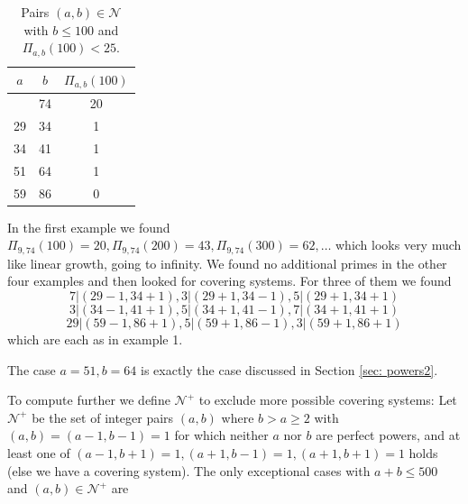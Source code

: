 \documentclass[12pt, a4paper,  reqno, english]{amsart}%
\numberwithin{equation}{section}
\theoremstyle{definition}
\renewcommand{\leq}{\leqslant}
\renewcommand{\geq}{\geqslant}
\begin{document}
\begin{table}[ht]
\begin{center}
\begin{tabular}{| c| c |  c   | }
\hline\newline
 $a$ & $b$  &   $\Pi_{a,b}(100)$ \\
\hline\newline
 9 & 74 &  20   \\
29 & 34 &   1  \\
34 & 41 &  1  \\
51 & 64 & 1   \\
59 & 86   & 0 \\
\hline 
\end{tabular}
    \end{center} \smallskip
      \caption{Pairs $(a,b)\in \mathcal N$ with $b\leq 100$ and $\Pi_{a,b}(100)< 25$.}
    \end{table}                           

In the first example we found $\Pi_{9,74}(100)=20, \Pi_{9,74}(200)=43, \Pi_{9,74}(300)=62,\dots$ which looks very much like linear growth, going to infinity. We found no additional primes in the other four examples and then looked for  covering systems. For three of them we found
\[ 7|(29-1, 34+1), 3|(29+1, 34-1),5|(29+1, 34+1) \]
\[ 3 |(34-1, 41+1),  5 |(34+1, 41-1),  7 |(34+1, 41+1)\]
\[  29 |(59-1, 86+1), 5 |(59+1, 86-1), 3|(59+1, 86+1)\]
which are each as in example 1. 

 The case $a=51, b=64$ is exactly the case discussed in Section \ref{sec: powers2}.
 
To compute further we define $ \mathcal N^+$ to exclude more possible covering systems:
 Let $ \mathcal N^+$ be the set of integer pairs $(a,b)$ where $b>a\geq 2$ with $(a,b)=(a-1,b-1)=1$ for which neither $a$ nor $b$ are perfect powers, and at least one of $(a-1,b+1)=1, (a+1,b-1)=1, (a+1,b+1)=1$ holds (else we have a covering system). The only exceptional cases with $a+b\leq 500$ and $(a,b)\in \mathcal N^+$ are
\end{document}
